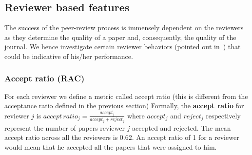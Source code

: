 \noindent
\subsection{Reviewer based features}
\label{reviewer_analysis}

The success of the peer-review process is immensely dependent on the reviewers as they determine the quality of a paper and, consequently, the quality of the journal. We hence investigate certain reviewer behaviors (pointed out in~\cite{sikdar2016anomalies}) that could  be indicative of his/her performance.

\subsubsection{Accept ratio (RAC)} For each reviewer we define a metric called accept ratio (this is different from the acceptance ratio defined in the previous section) Formally, the {\bf accept ratio} for reviewer $j$ is $accept\,ratio_{j}=\frac{accept_{j}}{accept_{j} + reject_{j}}$ 
where $accept_{j}$ and $reject_{j}$ respectively represent the number of papers reviewer $j$ accepted and rejected. The mean accept ratio across all the reviewers is $0.62$. An accept ratio of 1 for a reviewer would mean that he accepted all the papers that were assigned to him.

